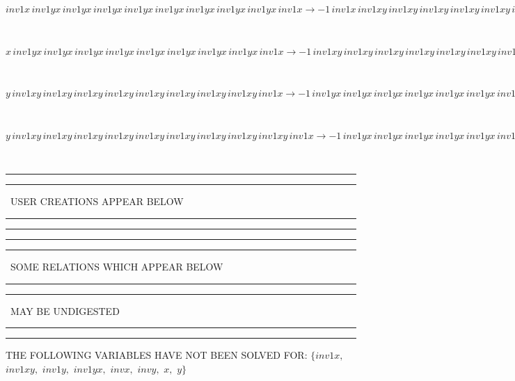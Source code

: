 \begin{minipage}{6in}
$
inv1x\,
 inv1yx\,
 inv1yx\,
 inv1yx\,
 inv1yx\,
 inv1yx\,
 inv1yx\,
 inv1yx\,
 inv1yx\,
 inv1x\rightarrow -1\,
 inv1x\,
 inv1xy\,
 inv1xy\,
 inv1xy\,
 inv1xy\,
 inv1xy\,
 inv1xy\,
 inv1xy\,
 inv1xy + inv1yx\,
 inv1yx\,
 inv1yx\,
 inv1yx\,
 inv1yx\,
 inv1yx\,
 inv1yx\,
 inv1yx\,
 inv1x + inv1x\,
 inv1xy\,
 inv1xy\,
 inv1xy\,
 inv1xy\,
 inv1xy\,
 inv1xy\,
 inv1xy\,
 inv1xy\,
 inv1x
$
\end{minipage}\medskip \\
\begin{minipage}{6in}
$
x\,
 inv1yx\,
 inv1yx\,
 inv1yx\,
 inv1yx\,
 inv1yx\,
 inv1yx\,
 inv1yx\,
 inv1yx\,
 inv1x\rightarrow -1\,
 inv1xy\,
 inv1xy\,
 inv1xy\,
 inv1xy\,
 inv1xy\,
 inv1xy\,
 inv1xy\,
 inv1xy + inv1xy\,
 inv1xy\,
 inv1xy\,
 inv1xy\,
 inv1xy\,
 inv1xy\,
 inv1xy\,
 inv1xy\,
 inv1x
$
\end{minipage}\medskip \\
\begin{minipage}{6in}
$
y\,
 inv1xy\,
 inv1xy\,
 inv1xy\,
 inv1xy\,
 inv1xy\,
 inv1xy\,
 inv1xy\,
 inv1xy\,
 inv1x\rightarrow -1\,
 inv1yx\,
 inv1yx\,
 inv1yx\,
 inv1yx\,
 inv1yx\,
 inv1yx\,
 inv1yx\,
 inv1x + inv1yx\,
 inv1yx\,
 inv1yx\,
 inv1yx\,
 inv1yx\,
 inv1yx\,
 inv1yx\,
 inv1yx\,
 inv1x + y\,
 inv1xy\,
 inv1xy\,
 inv1xy\,
 inv1xy\,
 inv1xy\,
 inv1xy\,
 inv1xy\,
 inv1xy
$
\end{minipage}\medskip \\
\begin{minipage}{6in}
$
y\,
 inv1xy\,
 inv1xy\,
 inv1xy\,
 inv1xy\,
 inv1xy\,
 inv1xy\,
 inv1xy\,
 inv1xy\,
 inv1xy\,
 inv1x\rightarrow -1\,
 inv1yx\,
 inv1yx\,
 inv1yx\,
 inv1yx\,
 inv1yx\,
 inv1yx\,
 inv1yx\,
 inv1yx\,
 inv1x + inv1yx\,
 inv1yx\,
 inv1yx\,
 inv1yx\,
 inv1yx\,
 inv1yx\,
 inv1yx\,
 inv1yx\,
 inv1yx\,
 inv1x + y\,
 inv1xy\,
 inv1xy\,
 inv1xy\,
 inv1xy\,
 inv1xy\,
 inv1xy\,
 inv1xy\,
 inv1xy\,
 inv1xy
$
\end{minipage}\\
\rule[2pt]{6in}{1pt}\hfil\break
\rule[2.5pt]{1.701in}{1pt}
\ USER CREATIONS APPEAR BELOW\ 
\rule[2.5pt]{1.701in}{1pt}\hfil\break
\rule[2pt]{6in}{1pt}\hfil\break
\rule[2pt]{6in}{4pt}\hfil\break
\rule[2pt]{1.45in}{4pt}
\ SOME RELATIONS WHICH APPEAR BELOW\ 
\rule[2pt]{1.45in}{4pt}\hfil\break
\rule[2pt]{2.18in}{4pt}
\ MAY BE UNDIGESTED\ 
\rule[2pt]{2.18in}{4pt}\hfil\break
\rule[2pt]{6in}{4pt}\hfil\break
THE FOLLOWING VARIABLES HAVE NOT BEEN SOLVED FOR:\hfil\break
$\{inv1x,
$ $
inv1xy,
$ $
inv1y,
$ $
inv1yx,
$ $
invx,
$ $
invy,
$ $
x,
$ $
y\}$
\smallskip\\
\vspace{10pt}

